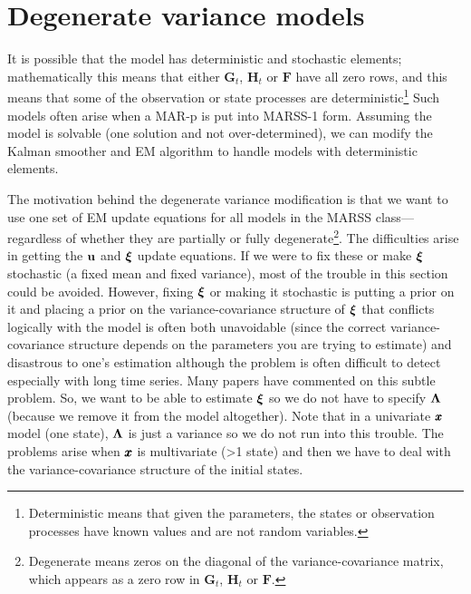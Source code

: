 \documentclass[]{article}
\def\xixi{\mbox{\boldmath $\xi$}}
\def\LAM{\mbox{\boldmath $\Lambda$}}
\def\FF{\mbox{$\mathbf F$}} \def\ff{\mbox{$\mathbf f$}}
\def\GG{\mbox{$\mathbf G$}}	\def\gg{\mbox{$\mathbf g$}}
\def\HH{\mbox{$\mathbf H$}}	\def\hh{\mbox{$\mathbf h$}}
\begin{document}
\section{Degenerate variance models}\label{sec:degenerate}
It is possible that the model has deterministic and stochastic elements; mathematically this means that either $\GG_t$, $\HH_t$ or $\FF$ have all zero rows, and this means that some of the observation or state processes are deterministic\footnote{Deterministic means that given the parameters, the states or observation processes have known values and are not random variables.} Such models often arise when a MAR-p is put into MARSS-1 form.  Assuming the model is solvable (one solution and not over-determined), we can modify the Kalman smoother and EM algorithm to handle models with deterministic elements.    

The motivation behind the degenerate variance modification is that we want to use one set of EM update equations for all models in the MARSS class---regardless of whether they are partially or fully degenerate\footnote{Degenerate means zeros on the diagonal of the variance-covariance matrix, which appears as a zero row in $\GG_t$, $\HH_t$ or $\FF$.}.  The difficulties arise in getting the $\mbox{$\mathbf u$}$ and $\xixi$ update equations.  If we were to fix these or make $\xixi$ stochastic (a fixed mean and fixed variance), most of the trouble in this section could be avoided.  However, fixing $\xixi$ or making it stochastic is putting a prior on it and placing a prior on the variance-covariance structure of $\xixi$ that conflicts logically with the model is often both unavoidable (since the correct variance-covariance structure depends on the parameters you are trying to estimate) and disastrous to one's estimation although the problem is often difficult to detect especially with long time series.  Many papers have commented on this subtle problem.  So, we want to be able to estimate $\xixi$ so we do not have to specify $\LAM$ (because we remove it from the model altogether).  Note that in a univariate $\mbox{$\pmb{x}$}$ model (one state), $\LAM$ is just a variance so we do not run into this trouble.  The problems arise when $\mbox{$\pmb{x}$}$ is multivariate (>1 state) and then we have to deal with the variance-covariance structure of the initial states. 
\end{document}
